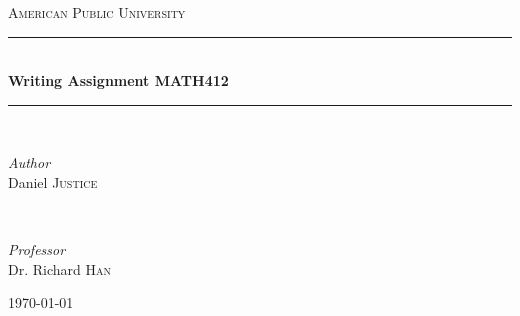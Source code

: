 \documentclass[11pt]{article}
\begin{document}

\begin{titlepage} %
	\newcommand{\HRule}{\rule{\linewidth}{0.5mm}} %

	\center %


	\textsc{\LARGE American Public University}\\[1.5cm] %


	\HRule\\[0.4cm]

	{\huge\bfseries Writing Assignment MATH412}\\[0.4cm] %

	\HRule\\[1.5cm]


	\begin{minipage}{0.4\textwidth}
		\begin{flushleft}
			\large
			\textit{Author}\\
			Daniel \textsc{Justice} %
		\end{flushleft}
	\end{minipage}
	~
	\begin{minipage}{0.4\textwidth}
		\begin{flushright}
			\large
			\textit{Professor}\\
			Dr. Richard \textsc{Han} %
		\end{flushright}
	\end{minipage}


	\vfill\vfill\vfill
	{\large\today} %
	\vfill

\end{titlepage}
\end{document}
